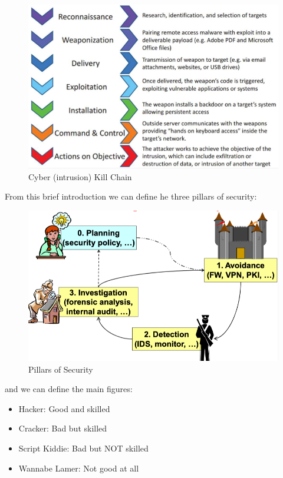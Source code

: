 \documentclass[12pt]{article}
\begin{document}
\begin{figure}[h!]
  \includegraphics[width=\linewidth]{images/killchain.png}
  \caption{Cyber (intrusion) Kill Chain}
  \label{fig:killchain}
\end{figure}

From this brief introduction we can define he three pillars of security:
\begin{figure}[H]
  \includegraphics[width=\linewidth]{images/pillars.png}
  \caption{Pillars of Security}
  \label{fig:pillars}
\end{figure}
and we can define the main figures:
\begin{itemize}
  \item Hacker: Good and skilled
  \item Cracker: Bad but skilled
  \item Script Kiddie: Bad but NOT skilled
  \item Wannabe Lamer: Not good at all
\end{itemize}
\end{document}
